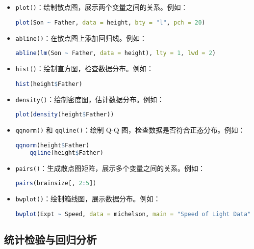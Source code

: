 \documentclass[UTF8]{report}
\theoremstyle{MyLineTheoremStyle} %
\theoremstyle{MyBlockTheoremStyle} %
\theoremstyle{MySubsubsectionStyle} %
\begin{document}
\begin{itemize}
    \item \texttt{plot()}：绘制散点图，展示两个变量之间的关系。例如：
    \begin{lstlisting}[language=R]
    plot(Son ~ Father, data = height, bty = "l", pch = 20)
    \end{lstlisting}
    \item \texttt{abline()}：在散点图上添加回归线。例如：
    \begin{lstlisting}[language=R]
    abline(lm(Son ~ Father, data = height), lty = 1, lwd = 2)
    \end{lstlisting}
    \item \texttt{hist()}：绘制直方图，检查数据分布。例如：
    \begin{lstlisting}[language=R]
    hist(height$Father)
    \end{lstlisting}
    \item \texttt{density()}：绘制密度图，估计数据分布。例如：
    \begin{lstlisting}[language=R]
    plot(density(height$Father))
    \end{lstlisting}
    \item \texttt{qqnorm()} 和 \texttt{qqline()}：绘制 Q-Q 图，检查数据是否符合正态分布。例如：
    \begin{lstlisting}[language=R]
    qqnorm(height$Father)
    qqline(height$Father)
    \end{lstlisting}
    \item \texttt{pairs()}：生成散点图矩阵，展示多个变量之间的关系。例如：
    \begin{lstlisting}[language=R]
    pairs(brainsize[, 2:5])
    \end{lstlisting}
    \item \texttt{bwplot()}：绘制箱线图，展示数据分布。例如：
    \begin{lstlisting}[language=R]
    bwplot(Expt ~ Speed, data = michelson, main = "Speed of Light Data", ylab = "Experiment No.")
    \end{lstlisting}
\end{itemize}

\subsection*{统计检验与回归分析}
\end{document}
